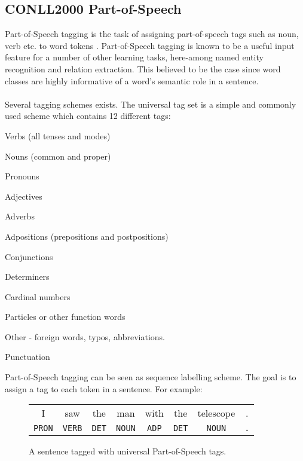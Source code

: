 \subsection{CONLL2000 Part-of-Speech}
Part-of-Speech tagging is the task of assigning part-of-speech tags such as noun, verb etc. to word tokens \citep{jurafsky09}. Part-of-Speech tagging is known to be a useful input feature for a number of other learning tasks, here-among named entity recognition and relation extraction. This believed to be the case since word classes are highly informative of a word's semantic role in a sentence.
\\\\
Several tagging schemes exists. The universal tag set is a simple and commonly used scheme which contains 12 different tags:
\begin{description}[labelindent=4em,leftmargin=8em,style=nextline]
	\item [VERB] Verbs (all tenses and modes)
	\item [NOUN] Nouns (common and proper)
	\item [PRON] Pronouns
	\item [ADJ] Adjectives
	\item [ADV] Adverbs
	\item [ADP] Adpositions (prepositions and postpositions)
	\item [CONJ] Conjunctions
	\item [DET] Determiners
	\item [NUM] Cardinal numbers
	\item [PRT] Particles or other function words
	\item [X] Other - foreign words, typos, abbreviations.
	\item [.] Punctuation
\end{description}
\noindent
Part-of-Speech tagging can be seen as sequence labelling scheme. The goal is to assign a tag to each token in a sentence. For example:
\begin{figure}[h]
	\begin{center}
		\begin{tabular}{c c c c c c c c}
	I & saw & the & man & with & the & telescope & . \\
	\texttt{PRON} & \texttt{VERB} & \texttt{DET} & \texttt{NOUN} & \texttt{ADP} & \texttt{DET} & \texttt{NOUN} & \texttt{.}	
		\end{tabular}
	\end{center}
	\caption{A sentence tagged with universal Part-of-Speech tags.}
	\label{pos}
\end{figure}

